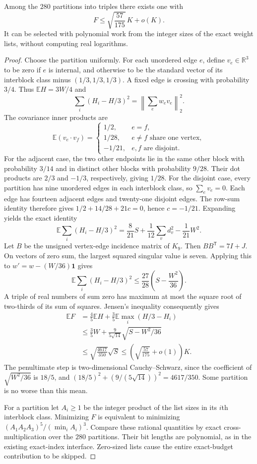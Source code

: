 \begin{lemma}
Among the $280$ partitions into triples there exists one with
\[
 F\le\sqrt{\frac{57}{175}}\,K+o(K).
\]
It can be selected with polynomial work from the integer sizes of the exact
weight lists, without computing real logarithms.
\end{lemma}
\begin{proof}
Choose the partition uniformly. For each unordered edge $e$, define
$v_e\in\mathbb R^3$ to be zero if $e$ is internal, and otherwise to be the
standard vector of its interblock class minus $(1/3,1/3,1/3)$. A fixed edge
is crossing with probability $3/4$. Thus $\mathbb EH=3W/4$ and
\[
 \sum_i(H_i-H/3)^2=\left\|\sum_e w_e v_e\right\|_2^2.
\]
The covariance inner products are
\[
 \mathbb E(v_e\cdot v_f)=
 \begin{cases}
 1/2,&e=f,\\
 1/28,&e\ne f\text{ share one vertex},\\
 -1/21,&e,f\text{ are disjoint}.
 \end{cases}
\]
For the adjacent case, the two other endpoints lie in the same other block
with probability $3/14$ and in distinct other blocks with probability $9/28$.
Their dot products are $2/3$ and $-1/3$, respectively, giving $1/28$.
For the disjoint case, every partition has nine unordered edges in each
interblock class, so $\sum_e v_e=0$. Each edge has fourteen adjacent edges and
twenty-one disjoint edges. The row-sum identity therefore gives
$1/2+14/28+21c=0$, hence $c=-1/21$.
Expanding yields the exact identity
\[
 \mathbb E\sum_i(H_i-H/3)^2
 =\frac8{21}S+\frac1{12}\sum_vd_v^2-\frac1{21}W^2.
\]
Let $B$ be the unsigned vertex-edge incidence matrix of $K_9$.
Then $BB^{\mathsf T}=7I+J$. On vectors of zero sum, the largest squared
singular value is seven. Applying this to
$w'=w-(W/36)\mathbf1$ gives
\[
 \mathbb E\sum_i(H_i-H/3)^2
 \le\frac{27}{28}\left(S-\frac{W^2}{36}\right).
\]
A triple of real numbers of sum zero has maximum at most the square root
of two-thirds of its sum of squares. Jensen's inequality consequently gives
\begin{align*}
 \mathbb EF
 &=\frac45\mathbb EH+\frac35\mathbb E\max_i(H/3-H_i)\\
 &\le\frac35W+\frac9{5\sqrt{14}}
                  \sqrt{S-W^2/36}\\
 &\le\sqrt{\frac{4617}{350}}\sqrt S
 \le\left(\sqrt{\frac{57}{175}}+o(1)\right)K.
\end{align*}
The penultimate step is two-dimensional Cauchy--Schwarz, since the coefficient
of $\sqrt{W^2/36}$ is $18/5$, and
$(18/5)^2+(9/(5\sqrt{14}))^2=4617/350$.
Some partition is no worse than this mean.

For a partition let $A_i\ge1$ be the integer product of the list sizes in its
$i$th interblock class. Minimizing $F$ is equivalent to minimizing
$(A_1A_2A_3)^5/(\min_iA_i)^3$. Compare these rational quantities by exact
cross-multiplication over the $280$ partitions. Their bit lengths are
polynomial, as in the existing exact-index interface. Zero-sized lists cause
the entire exact-budget contribution to be skipped.
\end{proof}

